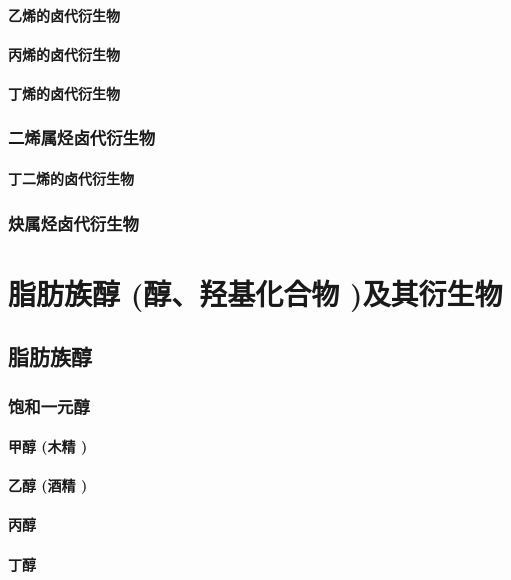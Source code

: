 \documentclass[UTF8]{../03-Chemistry}
\begin{document}
            \paragraph{乙烯的卤代衍生物}
            \paragraph{丙烯的卤代衍生物}
            \paragraph{丁烯的卤代衍生物}
        \subsubsection{二烯属烃卤代衍生物}
            \paragraph{丁二烯的卤代衍生物}
        \subsubsection{炔属烃卤代衍生物}

\section{脂肪族醇 (醇、羟基化合物 )及其衍生物}
    \subsection{脂肪族醇}
        \subsubsection{饱和一元醇}
            \paragraph{甲醇 (木精 )}
            \paragraph{乙醇 (酒精 )}
            \paragraph{丙醇}
            \paragraph{丁醇}
\end{document}
